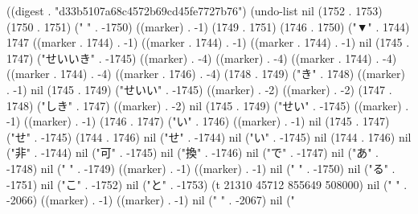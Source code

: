 
((digest . "d33b5107a68c4572b69cd45fe7727b76") (undo-list nil (1752 . 1753) (1750 . 1751) (" " . -1750) ((marker) . -1) (1749 . 1751) (1746 . 1750) ("▼" . 1744) 1747 ((marker . 1744) . -1) ((marker . 1744) . -1) ((marker . 1744) . -1) nil (1745 . 1747) ("せいいき" . -1745) ((marker) . -4) ((marker) . -4) ((marker . 1744) . -4) ((marker . 1744) . -4) ((marker . 1746) . -4) (1748 . 1749) ("き" . 1748) ((marker) . -1) nil (1745 . 1749) ("せいい" . -1745) ((marker) . -2) ((marker) . -2) (1747 . 1748) ("しき" . 1747) ((marker) . -2) nil (1745 . 1749) ("せい" . -1745) ((marker) . -1) ((marker) . -1) (1746 . 1747) ("い" . 1746) ((marker) . -1) nil (1745 . 1747) ("せ" . -1745) (1744 . 1746) nil ("せ" . -1744) nil ("い" . -1745) nil (1744 . 1746) nil ("非" . -1744) nil ("可" . -1745) nil ("換" . -1746) nil ("で" . -1747) nil ("あ" . -1748) nil ("
" . -1749) ((marker) . -1) ((marker) . -1) nil (" " . -1750) nil ("る" . -1751) nil ("こ" . -1752) nil ("と" . -1753) (t 21310 45712 855649 508000) nil ("
" . -2066) ((marker) . -1) ((marker) . -1) nil (" " . -2067) nil ("
